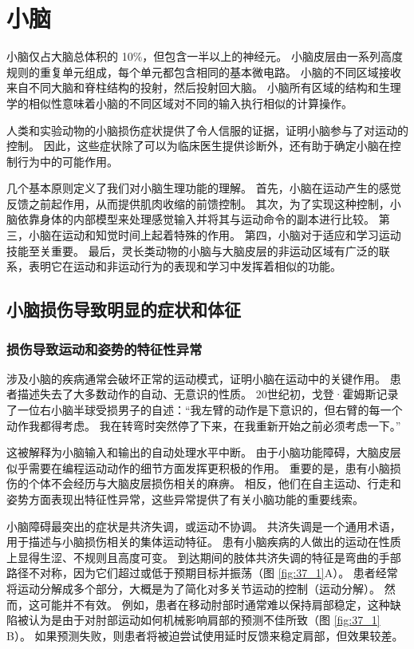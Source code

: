 \chapter{小脑} \label{chap:chap37}

小脑仅占大脑总体积的 10\%，但包含一半以上的神经元。 小脑皮层由一系列高度规则的重复单元组成，每个单元都包含相同的基本微电路。 小脑的不同区域接收来自不同大脑和脊柱结构的投射，然后投射回大脑。 小脑所有区域的结构和生理学的相似性意味着小脑的不同区域对不同的输入执行相似的计算操作。

人类和实验动物的小脑损伤症状提供了令人信服的证据，证明小脑参与了对运动的控制。 因此，这些症状除了可以为临床医生提供诊断外，还有助于确定小脑在控制行为中的可能作用。

几个基本原则定义了我们对小脑生理功能的理解。 首先，小脑在运动产生的感觉反馈之前起作用，从而提供肌肉收缩的前馈控制。 其次，为了实现这种控制，小脑依靠身体的内部模型来处理感觉输入并将其与运动命令的副本进行比较。 第三，小脑在运动和知觉时间上起着特殊的作用。 第四，小脑对于适应和学习运动技能至关重要。 最后，灵长类动物的小脑与大脑皮层的非运动区域有广泛的联系，表明它在运动和非运动行为的表现和学习中发挥着相似的功能。


\section{小脑损伤导致明显的症状和体征}
\subsection{损伤导致运动和姿势的特征性异常}
涉及小脑的疾病通常会破坏正常的运动模式，证明小脑在运动中的关键作用。 患者描述失去了大多数动作的自动、无意识的性质。 20世纪初，戈登·霍姆斯记录了一位右小脑半球受损男子的自述：“我左臂的动作是下意识的，但右臂的每一个动作我都得考虑。 我在转弯时突然停了下来，在我重新开始之前必须考虑一下。”

这被解释为小脑输入和输出的自动处理水平中断。 由于小脑功能障碍，大脑皮层似乎需要在编程运动动作的细节方面发挥更积极的作用。 重要的是，患有小脑损伤的个体不会经历与大脑皮层损伤相关的麻痹。 相反，他们在自主运动、行走和姿势方面表现出特征性异常，这些异常提供了有关小脑功能的重要线索。

小脑障碍最突出的症状是共济失调，或运动不协调。 共济失调是一个通用术语，用于描述与小脑损伤相关的集体运动特征。
患有小脑疾病的人做出的运动在性质上显得生涩、不规则且高度可变。 
到达期间的肢体共济失调的特征是弯曲的手部路径不对称，因为它们超过或低于预期目标并振荡（图 \ref{fig:37_1}A）。
患者经常将运动分解成多个部分，大概是为了简化对多关节运动的控制（运动分解）。 然而，这可能并不有效。 例如，患者在移动肘部时通常难以保持肩部稳定，这种缺陷被认为是由于对肘部运动如何机械影响肩部的预测不佳所致（图 \ref{fig:37_1} B）。 如果预测失败，则患者将被迫尝试使用延时反馈来稳定肩部，但效果较差。

